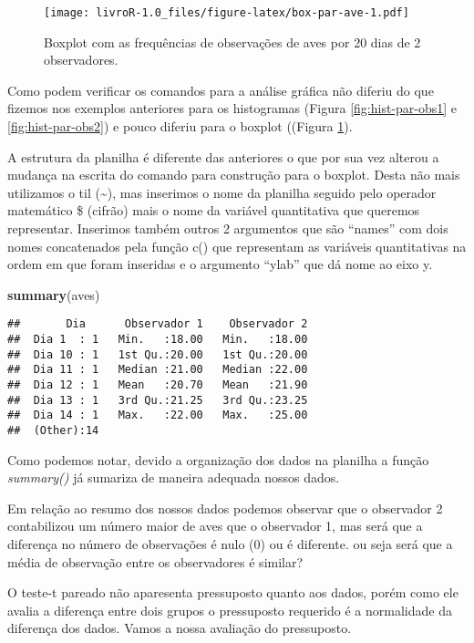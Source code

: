 \documentclass[]{book}
\newenvironment{Shaded}{\begin{snugshade}}{\end{snugshade}}
\newcommand{\KeywordTok}[1]{\textcolor[rgb]{0.13,0.29,0.53}{\textbf{#1}}}
\newcommand{\NormalTok}[1]{#1}
\begin{document}
\begin{figure}
\centering
\texttt{[image: livroR-1.0\_files/figure-latex/box-par-ave-1.pdf]}
\caption{\label{fig:box-par-ave}Boxplot com as frequências de observações de aves por 20 dias de 2 observadores.}
\end{figure}

Como podem verificar os comandos para a análise gráfica não diferiu do que fizemos nos exemplos anteriores para os histogramas (Figura \ref{fig:hist-par-obs1} e \ref{fig:hist-par-obs2}) e pouco diferiu para o boxplot ((Figura \ref{fig:box-par-ave}).

A estrutura da planilha é diferente das anteriores o que por sua vez alterou a mudança na escrita do comando para construção para o boxplot. Desta não mais utilizamos o til (\textasciitilde{}), mas inserimos o nome da planilha seguido pelo operador matemático \$ (cifrão) mais o nome da variável quantitativa que queremos representar. Inserimos também outros 2 argumentos que são ``names'' com dois nomes concatenados pela função c() que representam as variáveis quantitativas na ordem em que foram inseridas e o argumento ``ylab'' que dá nome ao eixo y.

\begin{Shaded}
\begin{Highlighting}[]
\KeywordTok{summary}\NormalTok{(aves)}
\end{Highlighting}
\end{Shaded}

\begin{verbatim}
##       Dia      Observador 1    Observador 2  
##  Dia 1  : 1   Min.   :18.00   Min.   :18.00  
##  Dia 10 : 1   1st Qu.:20.00   1st Qu.:20.00  
##  Dia 11 : 1   Median :21.00   Median :22.00  
##  Dia 12 : 1   Mean   :20.70   Mean   :21.90  
##  Dia 13 : 1   3rd Qu.:21.25   3rd Qu.:23.25  
##  Dia 14 : 1   Max.   :22.00   Max.   :25.00  
##  (Other):14
\end{verbatim}

Como podemos notar, devido a organização dos dados na planilha a função \emph{summary()} já sumariza de maneira adequada nossos dados.

Em relação ao resumo dos nossos dados podemos observar que o observador 2 contabilizou um número maior de aves que o observador 1, mas será que a diferença no número de observações é nulo (0) ou é diferente. ou seja será que a média de observação entre os observadores é similar?

O teste-t pareado não aparesenta pressuposto quanto aos dados, porém como ele avalia a diferença entre dois grupos o pressuposto requerido é a normalidade da diferença dos dados. Vamos a nossa avaliação do pressuposto.
\end{document}
